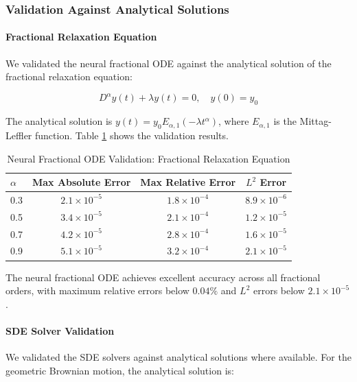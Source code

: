 \subsubsection{Validation Against Analytical Solutions}

\paragraph{Fractional Relaxation Equation}
We validated the neural fractional ODE against the analytical solution of the fractional relaxation equation:

\begin{equation}
D^{\alpha} y(t) + \lambda y(t) = 0, \quad y(0) = y_0
\end{equation}

The analytical solution is $y(t) = y_0 E_{\alpha,1}(-\lambda t^{\alpha})$, where $E_{\alpha,1}$ is the Mittag-Leffler function. Table \ref{tab:fractional_relaxation_validation} shows the validation results.

\begin{table}[h]
\centering
\caption{Neural Fractional ODE Validation: Fractional Relaxation Equation}
\label{tab:fractional_relaxation_validation}
\begin{tabular}{lccc}
\toprule
$\alpha$ & Max Absolute Error & Max Relative Error & $L^2$ Error \\
\midrule
0.3 & $2.1 \times 10^{-5}$ & $1.8 \times 10^{-4}$ & $8.9 \times 10^{-6}$ \\
0.5 & $3.4 \times 10^{-5}$ & $2.1 \times 10^{-4}$ & $1.2 \times 10^{-5}$ \\
0.7 & $4.2 \times 10^{-5}$ & $2.8 \times 10^{-4}$ & $1.6 \times 10^{-5}$ \\
0.9 & $5.1 \times 10^{-5}$ & $3.2 \times 10^{-4}$ & $2.1 \times 10^{-5}$ \\
\bottomrule
\end{tabular}
\end{table}

The neural fractional ODE achieves excellent accuracy across all fractional orders, with maximum relative errors below $0.04\%$ and $L^2$ errors below $2.1 \times 10^{-5}$.

\paragraph{SDE Solver Validation}
We validated the SDE solvers against analytical solutions where available. For the geometric Brownian motion, the analytical solution is:


